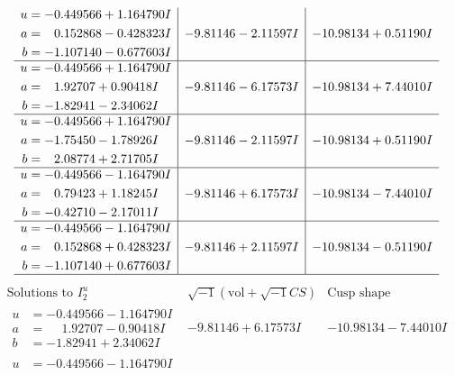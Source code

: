 \documentclass[1p]{elsarticle_modified}
\theoremstyle{definition}
\newcommand{\I}{\sqrt{-1}}
\begin{document}
$$\begin{array}{c|c|c}
\begin{aligned}
u &= -0.449566 + 1.164790 I \\
a &= \phantom{-}0.152868 - 0.428323 I \\
b &= -1.107140 - 0.677603 I\end{aligned}
 & -9.81146 - 2.11597 I & -10.98134 + 0.51190 I \\ \hline\begin{aligned}
u &= -0.449566 + 1.164790 I \\
a &= \phantom{-}1.92707 + 0.90418 I \\
b &= -1.82941 - 2.34062 I\end{aligned}
 & -9.81146 - 6.17573 I & -10.98134 + 7.44010 I \\ \hline\begin{aligned}
u &= -0.449566 + 1.164790 I \\
a &= -1.75450 - 1.78926 I \\
b &= \phantom{-}2.08774 + 2.71705 I\end{aligned}
 & -9.81146 - 2.11597 I & -10.98134 + 0.51190 I \\ \hline\begin{aligned}
u &= -0.449566 - 1.164790 I \\
a &= \phantom{-}0.79423 + 1.18245 I \\
b &= -0.42710 - 2.17011 I\end{aligned}
 & -9.81146 + 6.17573 I & -10.98134 - 7.44010 I \\ \hline\begin{aligned}
u &= -0.449566 - 1.164790 I \\
a &= \phantom{-}0.152868 + 0.428323 I \\
b &= -1.107140 + 0.677603 I\end{aligned}
 & -9.81146 + 2.11597 I & -10.98134 - 0.51190 I\\
 \hline 
 \end{array}$$\newpage$$\begin{array}{c|c|c}  
\text{Solutions to }I^u_{2}& \I (\text{vol} + \sqrt{-1}CS) & \text{Cusp shape}\\
 \hline 
\begin{aligned}
u &= -0.449566 - 1.164790 I \\
a &= \phantom{-}1.92707 - 0.90418 I \\
b &= -1.82941 + 2.34062 I\end{aligned}
 & -9.81146 + 6.17573 I & -10.98134 - 7.44010 I \\ \hline\begin{aligned}
u &= -0.449566 - 1.164790 I \\

\end{aligned}
\end{array}$$
\end{document}
